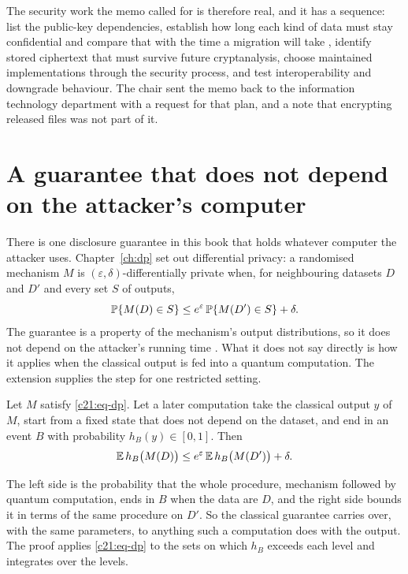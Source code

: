 The security work the memo called for is therefore real, and it has a sequence: list the
public-key dependencies, establish how long each kind of data must stay confidential and compare
that with the time a migration will take \citep{mosca2018}, identify stored ciphertext that must
survive future cryptanalysis, choose maintained implementations through the security process, and
test interoperability and downgrade behaviour. The chair sent the memo back to the information
technology department with a request for that plan, and a note that encrypting released files was
not part of it.

\section{A guarantee that does not depend on the attacker's computer}

There is one disclosure guarantee in this book that holds whatever computer the attacker uses.
Chapter~\ref{ch:dp} set out differential privacy: a randomised mechanism $M$ is $(\varepsilon,\delta)$-differentially private
when, for neighbouring datasets $D$ and $D'$ and every set $S$ of outputs,
\begin{equation}\label{c21:eq-dp}
\mathbb{P}\{M(D)\in S\}\le e^{\varepsilon}\,\mathbb{P}\{M(D')\in S\}+\delta.
\end{equation}
The guarantee is a property of the mechanism's output distributions, so it does not depend on the
attacker's running time \citep{dwork2014}. What it does not say directly is how it applies when
the classical output is fed into a quantum computation. The extension supplies the step for one
restricted setting.

\begin{proposition}\label{c21:prop-post}
Let $M$ satisfy \eqref{c21:eq-dp}. Let a later computation take the classical output $y$ of $M$, start from a fixed
state that does not depend on the dataset, and end in an event $B$ with probability $h_B(y)\in[0,1]$.
Then
\begin{equation}\label{c21:eq-post}
\mathbb{E}\,h_B\big(M(D)\big)\le e^{\varepsilon}\,\mathbb{E}\,h_B\big(M(D')\big)+\delta.
\end{equation}
\end{proposition}

The left side is the probability that the whole procedure, mechanism followed by quantum
computation, ends in $B$ when the data are $D$, and the right side bounds it in terms of the same
procedure on $D'$. So the classical guarantee carries over, with the same parameters, to anything
such a computation does with the output. The proof applies \eqref{c21:eq-dp} to the sets on which $h_B$ exceeds
each level and integrates over the levels.

